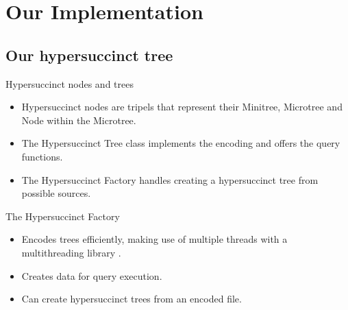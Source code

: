 \documentclass{beamer}
\begin{document}
\section{Our Implementation}

\subsection{Our hypersuccinct tree}

\begin{frame}{Hypersuccinct nodes and trees}
	\begin{itemize}
	\item
		Hypersuccinct nodes are tripels that represent their Minitree, Microtree and Node within the Microtree.
	\item
		The Hypersuccinct Tree class implements the encoding and offers the query functions.
	\item
		The Hypersuccinct Factory handles creating a hypersuccinct tree from possible sources.
	\end{itemize}
\end{frame}

\begin{frame}{The Hypersuccinct Factory}
	\begin{itemize}
	\item
		Encodes trees efficiently, making use of multiple threads with a multithreading library \cite{threading}.
	\item
		Creates data for query execution.
	\item
		Can create hypersuccinct trees from an encoded file.
	\end{itemize}
\end{frame}
\end{document}
